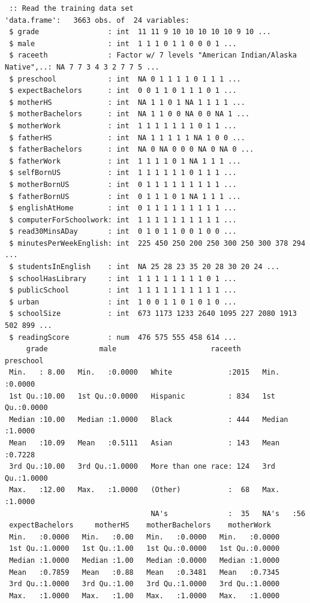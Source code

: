 \documentclass[letterpaper, 9pt, onecolumn, twoside, technote, final]{IEEEtran}
\begin{document}
\begin{verbatim}
 :: Read the training data set
'data.frame':	3663 obs. of  24 variables:
 $ grade                : int  11 11 9 10 10 10 10 10 9 10 ...
 $ male                 : int  1 1 1 0 1 1 0 0 0 1 ...
 $ raceeth              : Factor w/ 7 levels "American Indian/Alaska Native",..: NA 7 7 3 4 3 2 7 7 5 ...
 $ preschool            : int  NA 0 1 1 1 1 0 1 1 1 ...
 $ expectBachelors      : int  0 0 1 1 0 1 1 1 0 1 ...
 $ motherHS             : int  NA 1 1 0 1 NA 1 1 1 1 ...
 $ motherBachelors      : int  NA 1 1 0 0 NA 0 0 NA 1 ...
 $ motherWork           : int  1 1 1 1 1 1 1 0 1 1 ...
 $ fatherHS             : int  NA 1 1 1 1 1 NA 1 0 0 ...
 $ fatherBachelors      : int  NA 0 NA 0 0 0 NA 0 NA 0 ...
 $ fatherWork           : int  1 1 1 1 0 1 NA 1 1 1 ...
 $ selfBornUS           : int  1 1 1 1 1 1 0 1 1 1 ...
 $ motherBornUS         : int  0 1 1 1 1 1 1 1 1 1 ...
 $ fatherBornUS         : int  0 1 1 1 0 1 NA 1 1 1 ...
 $ englishAtHome        : int  0 1 1 1 1 1 1 1 1 1 ...
 $ computerForSchoolwork: int  1 1 1 1 1 1 1 1 1 1 ...
 $ read30MinsADay       : int  0 1 0 1 1 0 0 1 0 0 ...
 $ minutesPerWeekEnglish: int  225 450 250 200 250 300 250 300 378 294 ...
 $ studentsInEnglish    : int  NA 25 28 23 35 20 28 30 20 24 ...
 $ schoolHasLibrary     : int  1 1 1 1 1 1 1 1 0 1 ...
 $ publicSchool         : int  1 1 1 1 1 1 1 1 1 1 ...
 $ urban                : int  1 0 0 1 1 0 1 0 1 0 ...
 $ schoolSize           : int  673 1173 1233 2640 1095 227 2080 1913 502 899 ...
 $ readingScore         : num  476 575 555 458 614 ...
     grade            male                      raceeth       preschool
 Min.   : 8.00   Min.   :0.0000   White             :2015   Min.   :0.0000
 1st Qu.:10.00   1st Qu.:0.0000   Hispanic          : 834   1st Qu.:0.0000
 Median :10.00   Median :1.0000   Black             : 444   Median :1.0000
 Mean   :10.09   Mean   :0.5111   Asian             : 143   Mean   :0.7228
 3rd Qu.:10.00   3rd Qu.:1.0000   More than one race: 124   3rd Qu.:1.0000
 Max.   :12.00   Max.   :1.0000   (Other)           :  68   Max.   :1.0000
                                  NA's              :  35   NA's   :56
 expectBachelors     motherHS    motherBachelors    motherWork
 Min.   :0.0000   Min.   :0.00   Min.   :0.0000   Min.   :0.0000
 1st Qu.:1.0000   1st Qu.:1.00   1st Qu.:0.0000   1st Qu.:0.0000
 Median :1.0000   Median :1.00   Median :0.0000   Median :1.0000
 Mean   :0.7859   Mean   :0.88   Mean   :0.3481   Mean   :0.7345
 3rd Qu.:1.0000   3rd Qu.:1.00   3rd Qu.:1.0000   3rd Qu.:1.0000
 Max.   :1.0000   Max.   :1.00   Max.   :1.0000   Max.   :1.0000

\end{verbatim}
\end{document}
